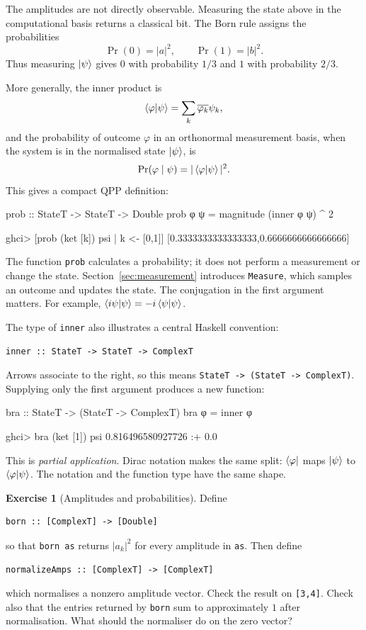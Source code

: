 \documentclass[11pt,a4paper]{article}
\theoremstyle{definition}
\newtheorem{exercise}{Exercise}[section]
\begin{document}
The amplitudes are not directly observable.  Measuring the state above in
the computational basis returns a classical bit.  The Born rule assigns the
probabilities
\[
  \Pr(0)=|a|^2,\qquad \Pr(1)=|b|^2.
\]
Thus measuring $\left| \psi \right\rangle$ gives $0$ with probability $1/3$ and $1$ with
probability $2/3$.

More generally, the inner product is
\[
  \left\langle \varphi \middle| \psi \right\rangle=\sum_k \overline{\varphi_k}\psi_k,
\]
and the probability of outcome $\varphi$ in an orthonormal measurement basis,
when the system is in the normalised state $\left| \psi \right\rangle$, is
\[
  \Pr(\varphi\mid\psi)=|\left\langle \varphi \middle| \psi \right\rangle|^2.
\]
This gives a compact QPP definition:
\begin{qppcode}
prob :: StateT -> StateT -> Double
prob φ ψ = magnitude (inner φ ψ) ^ 2

ghci> [prob (ket [k]) psi | k <- [0,1]]
[0.3333333333333333,0.6666666666666666]
\end{qppcode}
The function \lstinline|prob| calculates a probability; it does not perform a
measurement or change the state.  Section~\ref{sec:measurement} introduces
\lstinline|Measure|, which samples an outcome and updates the state.
The conjugation in the first argument matters.  For example,
$\left\langle i\psi \middle| \psi \right\rangle=-i\left\langle \psi \middle| \psi \right\rangle$.

The type of \lstinline|inner| also illustrates a central Haskell convention:
\begin{lstlisting}
inner :: StateT -> StateT -> ComplexT
\end{lstlisting}
Arrows associate to the right, so this means
\lstinline|StateT -> (StateT -> ComplexT)|.  Supplying only the first
argument produces a new function:
\begin{qppcode}
bra :: StateT -> (StateT -> ComplexT)
bra φ = inner φ

ghci> bra (ket [1]) psi
0.816496580927726 :+ 0.0
\end{qppcode}
This is \emph{partial application}.  Dirac notation makes the same split:
$\left\langle \varphi \right|$ maps $\left| \psi \right\rangle$ to $\left\langle \varphi \middle| \psi \right\rangle$.  The notation and
the function type have the same shape.

\begin{exercise}[Amplitudes and probabilities]
Define
\begin{lstlisting}
born :: [ComplexT] -> [Double]
\end{lstlisting}
so that \lstinline|born as| returns $|a_k|^2$ for every amplitude in
\lstinline|as|.  Then define
\begin{lstlisting}
normalizeAmps :: [ComplexT] -> [ComplexT]
\end{lstlisting}
which normalises a nonzero amplitude vector.  Check the result on
\lstinline|[3,4]|.  Check also that the entries returned by \lstinline|born|
sum to approximately $1$ after normalisation.  What should the normaliser do
on the zero vector?
\end{exercise}
\end{document}
